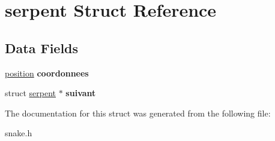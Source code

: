\hypertarget{structserpent}{\section{serpent Struct Reference}
\label{structserpent}
}
\subsection*{Data Fields}
\begin{DoxyCompactItemize}
\item 
\hypertarget{structserpent_af443f40fa20dcd8df78e12f66301031a}{\hyperlink{structposition}{position} {\bfseries coordonnees}}\label{structserpent_af443f40fa20dcd8df78e12f66301031a}

\item 
\hypertarget{structserpent_a68a830b195ddf9e590926b84ece77827}{struct \hyperlink{structserpent}{serpent} $\ast$ {\bfseries suivant}}\label{structserpent_a68a830b195ddf9e590926b84ece77827}

\end{DoxyCompactItemize}


The documentation for this struct was generated from the following file\-:\begin{DoxyCompactItemize}
\item 
snake.\-h\end{DoxyCompactItemize}
